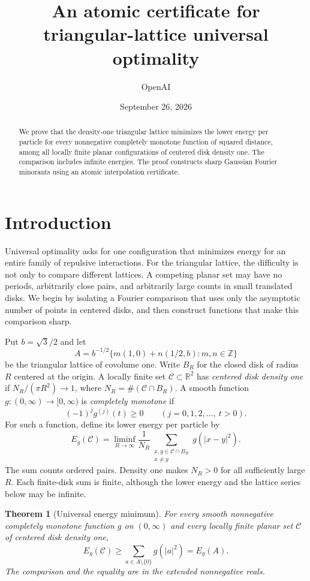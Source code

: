 \documentclass[11pt]{article}
\title{An atomic certificate for triangular-lattice universal optimality}
\author{OpenAI}
\date{September 26, 2026}
\newtheorem{theorem}{Theorem}[section]
\theoremstyle{remark}\newtheorem{remark}[theorem]{Remark}
\begin{document}
\maketitle
\begin{abstract}
We prove that the density-one triangular lattice minimizes the lower energy
per particle for every nonnegative completely monotone function of squared
distance, among all locally finite planar configurations of centered disk
density one. The comparison includes infinite energies. The proof constructs
sharp Gaussian Fourier minorants using an atomic interpolation certificate.
\end{abstract}

\section{Introduction}\label{sec:introduction}

Universal optimality asks for one configuration that minimizes energy for
an entire family of repulsive interactions. For the triangular lattice,
the difficulty is not only to compare different lattices. A competing
planar set may have no periods, arbitrarily close pairs, and arbitrarily
large counts in small translated disks. We begin by isolating a Fourier
comparison that uses only the asymptotic number of points in centered
disks, and then construct functions that make this comparison sharp.

Put $b=\sqrt3/2$ and let
\[
 A=b^{-1/2}\{m(1,0)+n(1/2,b):m,n\in\mathbb Z\}
\]
be the triangular lattice of covolume one. Write $B_R$ for the closed disk
of radius $R$ centered at the origin. A locally finite set
$\mathcal C\subset\mathbb R^2$ has \emph{centered disk density one} if
$N_R/(\pi R^2)\to1$, where $N_R=\#(\mathcal C\cap B_R)$.
A smooth function $g:(0,\infty)\to[0,\infty)$ is \emph{completely monotone}
if
\[
 (-1)^j g^{(j)}(t)\ge0\qquad(j=0,1,2,\ldots,\ t>0).
\]
For such a function, define its lower energy per particle by
\[
 E_g(\mathcal C)=\liminf_{R\to\infty}\frac1{N_R}
 \sum_{\substack{x,y\in\mathcal C\cap B_R\\x\ne y}}g(|x-y|^2).
\]
The sum counts ordered pairs. Density one makes $N_R>0$ for all sufficiently
large $R$. Each finite-disk sum is finite, although the lower energy and
the lattice series below may be infinite.

\begin{theorem}[Universal energy minimum]\label{thm:universal}
For every smooth nonnegative completely monotone function $g$ on
$(0,\infty)$ and every locally finite planar set $\mathcal C$ of centered
disk density one,
\[
 E_g(\mathcal C)\ge
 \sum_{a\in A\setminus\{0\}}g(|a|^2)=E_g(A).
\]
The comparison and the equality are in the extended nonnegative reals.
\end{theorem}
\end{document}
